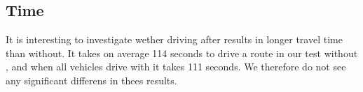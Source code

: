 \subsection{Time}
It is interesting to investigate wether driving after \tech results in longer travel time than without.
It takes on average 114 seconds to drive a route in our test without \tech, and when all vehicles drive with \tech it takes 111 seconds. 
We therefore do not see any significant differens in thees results.


